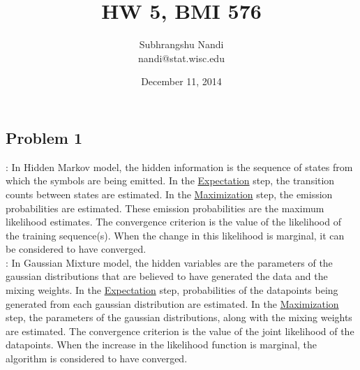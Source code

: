 \documentclass[11pt]{extarticle} %
\begin{document}

\title{HW 5, BMI 576}
\author{Subhrangshu Nandi\\
  nandi@stat.wisc.edu}
\date{December 11, 2014}

\maketitle

\subsection*{Problem 1}
: In Hidden Markov model, the hidden information is the sequence of states from which the symbols are being emitted. In the {\underline{Expectation}} step, the transition counts between states are estimated. In the {\underline{Maximization}} step, the emission probabilities are estimated. These emission probabilities are the maximum likelihood estimates. The convergence criterion is the value of the likelihood of the training sequence(s). When the change in this likelihood is marginal, it can be considered to have converged.\\
: In Gaussian Mixture model, the hidden variables are the parameters of the gaussian distributions that are believed to have generated the data and the mixing weights. In the {\underline{Expectation}} step, probabilities of the datapoints being generated from each gaussian distribution are estimated. In the {\underline{Maximization}} step, the parameters of the gaussian distributions, along with the mixing weights are estimated. The convergence criterion is the value of the joint likelihood of the datapoints. When the increase in the likelihood function is marginal, the algorithm is considered to have converged.
\end{document}

